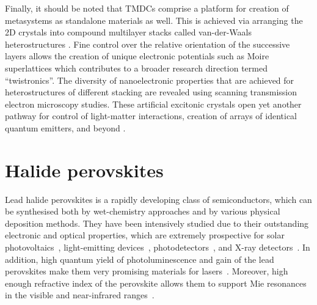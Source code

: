 \documentclass[journal=chreay,manuscript=review]{achemso}
\begin{document}
Finally, it should be noted that TMDCs comprise a platform for creation of metasystems as standalone materials as well. This is achieved via arranging the 2D crystals into compound multilayer stacks called van-der-Waals heterostructures \cite{geim2013van}. Fine control over the relative orientation of the successive layers allows the creation of unique electronic potentials such as Moire superlattices \cite{tran2019evidence, seyler2019signatures} which contributes to a broader research direction termed ``twistronics''\cite{carr2017twistronics}. The diversity of nanoelectronic properties that are achieved for heterostructures of different stacking are revealed using scanning transmission electron microscopy studies\cite{weston2020atomic}. These artificial excitonic crystals open yet another pathway for control of light-matter interactions, creation of arrays of identical quantum emitters, and beyond \cite{tran2020moire}. 

\section{Halide perovskites}

Lead halide perovskites is a rapidly developing class of semiconductors, which can be synthesised both by wet-chemistry approaches and by various physical deposition methods. They have been intensively studied due to their outstanding electronic and optical properties, which are extremely prospective for solar photovoltaics~\cite{stranks2015metal,jena2019halide,li2020perovskite}, light-emitting devices~\cite{sutherland2016perovskite, liu2021metal, gets2021reconfigurable}, photodetectors~\cite{dou2014solution,ahmadi2017review,marunchenko2021single}, and X-ray detectors~\cite{wei2016sensitive}. In addition, high quantum yield of photoluminescence and gain of the lead perovskites make them very promising materials for lasers~\cite{zhu2015lead, sutherland2016perovskite, zhang2017advances}. Moreover, high enough refractive index of the perovskite allows them to support Mie resonances in the visible and near-infrared ranges~\cite{tiguntseva2018light,tiguntseva2020room}. 
\end{document}
